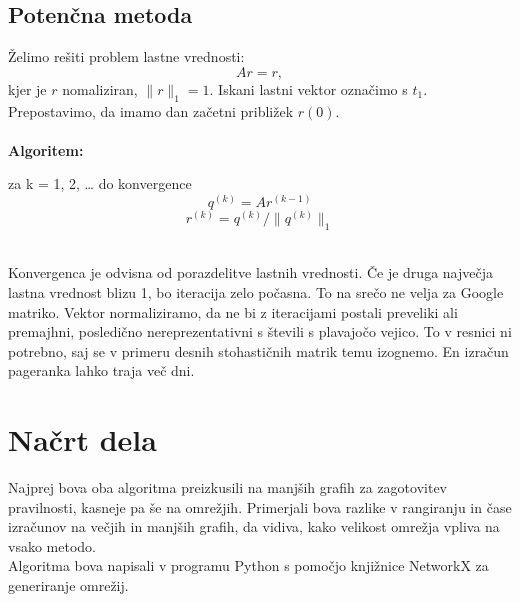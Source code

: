 \documentclass[a4paper]{article}
\begin{document}
\subsection{Potenčna metoda}
\hspace{4.8mm}Želimo rešiti problem lastne vrednosti:
$$Ar = r,$$
kjer je $r$ nomaliziran, $\|r\|_1=1$. Iskani lastni vektor označimo s $t_1$. \\
Prepostavimo, da imamo dan začetni približek $r{(0)}$. \\
\\
\textbf{Algoritem:} \\
\begin{center} za k = 1, 2, … do konvergence
	$$q^{(k)} = Ar^{(k-1)}$$ 
	$$r^{(k)} = q^{(k)}/ \|q^{(k)}\|_1$$ \\
\end{center}
Konvergenca je odvisna od porazdelitve lastnih vrednosti. Če je druga največja lastna vrednost blizu 1, bo iteracija zelo počasna. To na srečo ne velja za Google matriko. Vektor normaliziramo, da ne bi z iteracijami postali preveliki ali premajhni, posledično nereprezentativni s števili s plavajočo vejico. To v resnici ni potrebno, saj se v primeru desnih stohastičnih matrik temu izognemo. 
En izračun pageranka lahko traja več dni.

\section{Načrt dela}
\hspace{4.8mm}Najprej bova oba algoritma preizkusili na manjših grafih za zagotovitev pravilnosti, kasneje pa še na omrežjih. Primerjali bova razlike v rangiranju in čase izračunov na večjih in manjših grafih, da vidiva, kako velikost omrežja vpliva na vsako metodo. \\
Algoritma bova napisali v programu Python s pomočjo knjižnice NetworkX za generiranje omrežij. 
\end{document}

